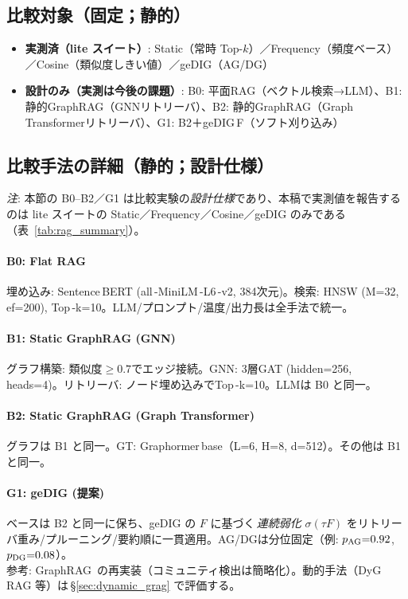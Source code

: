 \documentclass[ja=standard,xelatex]{bxjsarticle}
\begin{document}
\subsection{比較対象（固定；静的）}
\label{sec:rag_baselines}
\begin{itemize}[leftmargin=1.6em]
  \item \textbf{実測済（lite スイート）}: Static（常時 Top-$k$）／Frequency（頻度ベース）／Cosine（類似度しきい値）／geDIG（AG/DG）
  \item \textbf{設計のみ（実測は今後の課題）}: B0: 平面RAG（ベクトル検索→LLM）、B1: 静的GraphRAG（GNNリトリーバ）、B2: 静的GraphRAG（Graph Transformerリトリーバ）、G1: B2＋geDIG\,F（ソフト刈り込み）
\end{itemize}

\subsection{比較手法の詳細（静的；設計仕様）}\label{sec:rag_methods_detail}
\noindent\textit{注}: 本節の B0--B2／G1 は比較実験の\emph{設計仕様}であり、本稿で実測値を報告するのは lite スイートの Static／Frequency／Cosine／geDIG のみである（表~\ref{tab:rag_summary}）。\\
\paragraph{B0: Flat RAG}\; 埋め込み: Sentence\,BERT (all\,\mbox{-}MiniLM\,\mbox{-}L6\,\mbox{-}v2, 384次元)。検索: HNSW (M=32, ef=200), Top\,\mbox{-}k=10。LLM/プロンプト/温度/出力長は全手法で統一。\\
\paragraph{B1: Static GraphRAG (GNN)}\; グラフ構築: 類似度$\ge0.7$でエッジ接続。GNN: 3層GAT (hidden=256, heads=4)。リトリーバ: ノード埋め込みでTop\,\mbox{-}k=10。LLMは B0 と同一。\\
\paragraph{B2: Static GraphRAG (Graph Transformer)}\; グラフは B1 と同一。GT: Graphormer\,base（L=6, H=8, d=512）。その他は B1 と同一。\\
\paragraph{G1: geDIG (提案)}\; ベースは B2 と同一に保ち、geDIG の $F$ に基づく\,\emph{連続弱化} $\sigma(\tau F)$ をリトリーバ重み/プルーニング/要約順に一貫適用。AG/DGは分位固定（例: $p_{\rm AG}{=}0.92$, $p_{\rm DG}{=}0.08$）。\\
\noindent 参考: GraphRAG\,\cite{graphrag2024} の再実装（コミュニティ検出は簡略化）。動的手法（DyG\,RAG 等）は\,\S\ref{sec:dynamic_grag} で評価する。
\end{document}
